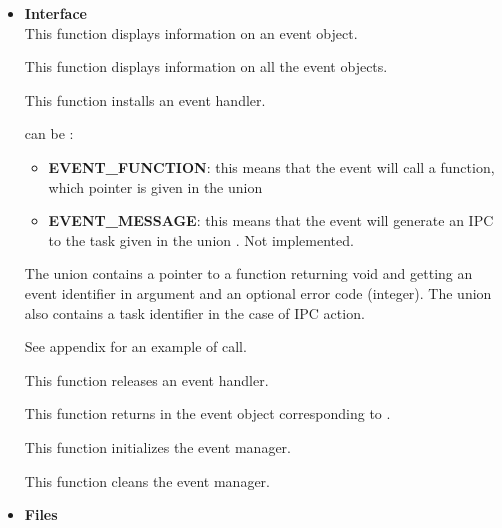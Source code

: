 \begin{itemize}
  \item {\bf Interface}\\

	 {
	   This function displays information on an event object.
	 }

	 {
	   This function displays information on all the event objects.
	 }

	 {
	   This function installs an event handler.

	    can be :
	   \begin{itemize}
	     \item
	       \textbf{EVENT\_FUNCTION}: this means that the event will
	       call a function, which pointer is given in the union
	     \item
	       \textbf{EVENT\_MESSAGE}: this means that the event will
	       generate an IPC to the task given in the union
	       . Not implemented.
	   \end{itemize}

	   The union  contains a pointer to a
	   function returning void and getting an event identifier in
	   argument and an optional error code (integer). The union
	   also contains a task identifier in the case of IPC action.

	   See appendix for an example of call.
	 }

	 {
	   This function releases an event handler.
	 }

	 {
	   This function returns in  the event object
	   corresponding to .
	 }

	 {
	   This function initializes the event manager.
	 }

	 {
	   This function cleans the event manager.
	 }

  \item {\bf {Files}}\\


\end{itemize}

